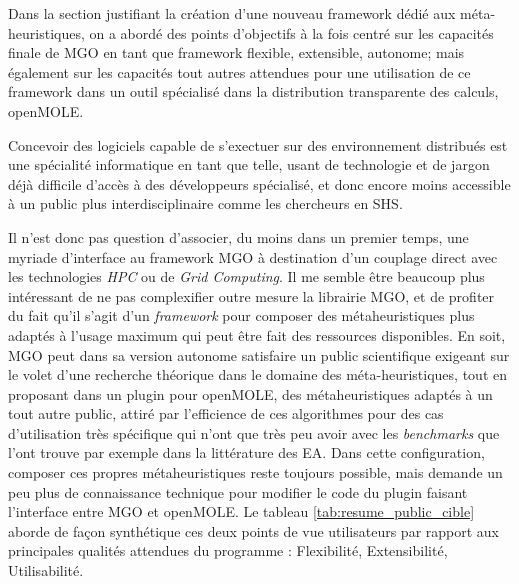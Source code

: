 Dans la section justifiant la création d'une nouveau framework dédié aux méta-heuristiques, on a abordé des points d'objectifs à la fois centré sur les capacités finale de MGO en tant que framework flexible, extensible, autonome; mais également sur les capacités tout autres attendues pour une utilisation de ce framework dans un outil spécialisé dans la distribution transparente des calculs, openMOLE.

Concevoir des logiciels capable de s'exectuer sur des environnement distribués est une spécialité informatique en tant que telle, usant de technologie et de jargon déjà difficile d'accès à des développeurs spécialisé, et donc encore moins accessible à un public plus interdisciplinaire comme les chercheurs en SHS.

Il n'est donc pas question d'associer, du moins dans un premier temps, une myriade d'interface au framework MGO à destination d'un couplage direct avec les technologies \textit{HPC} ou de \textit{Grid Computing}. Il me semble être beaucoup plus intéressant de ne pas complexifier outre mesure la librairie MGO, et de profiter du fait qu'il s'agit d'un \textit{framework} pour composer des métaheuristiques plus adaptés à l'usage maximum qui peut être fait des ressources disponibles. En soit, MGO peut dans sa version autonome satisfaire un public scientifique exigeant sur le volet d'une recherche théorique dans le domaine des méta-heuristiques, tout en proposant dans un plugin pour openMOLE, des métaheuristiques adaptés à un tout autre public, attiré par l'efficience de ces algorithmes pour des cas d'utilisation très spécifique qui n'ont que très peu avoir avec les \textit{benchmarks} que l'ont trouve par exemple dans la littérature des EA. Dans cette configuration, composer ces propres métaheuristiques reste toujours possible, mais demande un peu plus de connaissance technique pour modifier le code du plugin faisant l'interface entre MGO et openMOLE. Le tableau \ref{tab:resume_public_cible} aborde de façon synthétique ces deux points de vue utilisateurs par rapport aux principales qualités attendues du programme : Flexibilité, Extensibilité, Utilisabilité.



